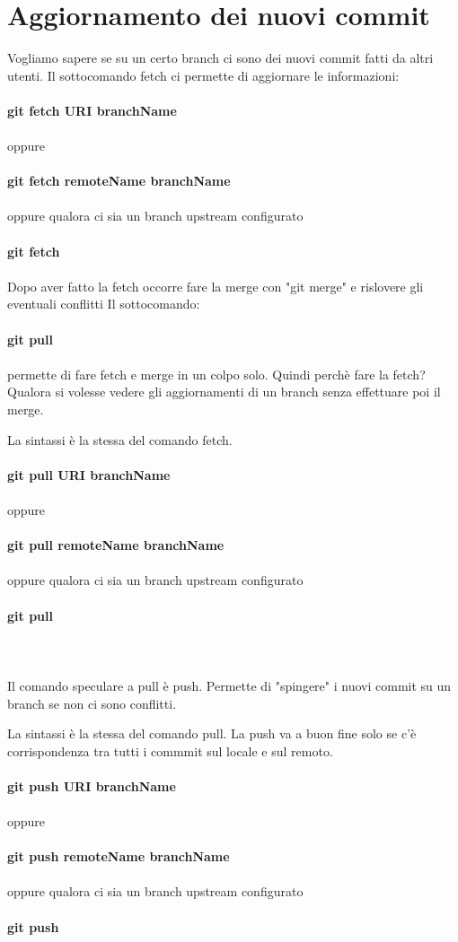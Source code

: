 \documentclass[a4paper,12pt]{report}
\begin{document}
\section{Aggiornamento dei nuovi commit}
Vogliamo sapere se su un certo branch ci sono dei nuovi commit fatti da altri utenti.
Il sottocomando fetch ci permette di aggiornare le informazioni:
\\\\
\textbf{git fetch URI branchName}
\\\\
oppure
\\\\
\textbf{git fetch remoteName branchName}
\\\\
oppure qualora ci sia un branch upstream configurato
\\\\
\textbf{git fetch}
\\\\
Dopo aver fatto la fetch occorre fare la merge con "git merge" e rislovere gli eventuali conflitti
Il sottocomando:
\\\\
\textbf{git pull}
\\\\
permette di fare fetch e merge in un colpo solo.
Quindi perchè fare la fetch? Qualora si volesse vedere gli aggiornamenti di un branch senza effettuare poi il merge.

La sintassi è la stessa del comando fetch.
\\\\
\textbf{git pull URI branchName}
\\\\
oppure
\\\\
\textbf{git pull remoteName branchName}
\\\\
oppure qualora ci sia un branch upstream configurato
\\\\
\textbf{git pull}
\\\\
\\\\Il comando speculare a pull è push. Permette di "spingere" i nuovi commit su un branch se non ci sono conflitti.

La sintassi è la stessa del comando pull. La push va a buon fine solo se c'è corrispondenza tra tutti i commmit sul locale e sul remoto. 
\\\\
\textbf{git push URI branchName}
\\\\
oppure
\\\\
\textbf{git push remoteName branchName}
\\\\
oppure qualora ci sia un branch upstream configurato
\\\\
\textbf{git push}
\\\\
\end{document}

